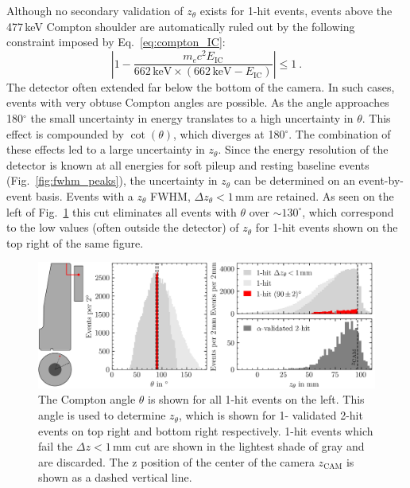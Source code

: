 Although no secondary validation of $z_\theta$ exists for 1-hit events, events above the 477\,keV Compton shoulder are automatically ruled out by the following constraint imposed by Eq.~\ref{eq:compton_IC}:
\begin{equation}
	\left|1 - \dfrac{m_ec^2 E_\text{IC}}{662\,\text{keV} \times \left(662\,\text{keV} - E_\text{IC}\right)}\right| \leq 1~.
\end{equation}
The detector often extended far below the bottom of the camera. In such cases, events with very obtuse Compton angles are possible. As the angle approaches 180$^\circ$ the small uncertainty in energy translates to a high uncertainty in $\theta$. This effect is compounded by $\cot(\theta)$, which diverges at 180$^\circ$. The combination of these effects led to a large uncertainty in $z_\theta$. Since the energy resolution of the detector is known at all energies for soft pileup and resting baseline events (Fig.~\ref{fig:fwhm_peaks}), the uncertainty in $z_\theta$ can be determined on an event-by-event basis. Events with a $z_\theta$ FWHM, $\Delta z_\theta < 1$\,mm are retained. As seen on the left of Fig.~\ref{fig:z_reconstruction_histograms} this cut eliminates all events with $\theta$ over $\sim 130^\circ$, which correspond to the low values (often outside the detector) of $z_\theta$ for 1-hit events shown on the top right of the same figure. 
\begin{figure}[htb]
    \centering
    \includegraphics[width=6in]{figs/pipeline/z_reconstruction_histograms.png}
    \caption{The Compton angle $\theta$ is shown for all 1-hit events on the left. This angle is used to determine $z_\theta$, which is shown for 1- validated 2-hit events on top right and bottom right respectively. 1-hit events which fail the $\Delta z < 1$\,mm cut are shown in the lightest shade of gray and are discarded. The z position of the center of the camera $z_\text{CAM}$ is shown as a dashed vertical line.}
    \label{fig:z_reconstruction_histograms}
\end{figure}

